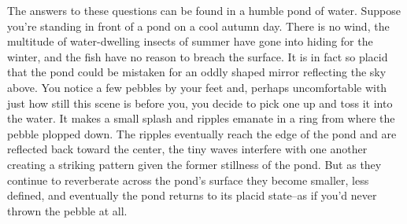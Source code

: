 The answers to these questions can be found in a humble pond of water. Suppose you're standing in front of a pond on a cool autumn day. There is no wind, the multitude of  water-dwelling insects of summer have gone into hiding for the winter, and the fish have no reason to breach the surface. It is in fact so placid that the pond could be mistaken for an oddly shaped mirror reflecting the sky above. You notice a few pebbles by your feet and, perhaps uncomfortable with just how still this scene is before you, you decide to pick one up and toss it into the water. It makes a small splash and ripples emanate in a ring from where the pebble plopped down. The ripples eventually reach the edge of the pond and are reflected back toward the center, the tiny waves interfere with one another creating a striking pattern given the former stillness of the pond. But as they continue to reverberate across the pond's surface they become smaller, less defined, and eventually the pond returns to its placid state--as if you'd never thrown the pebble at all. 

